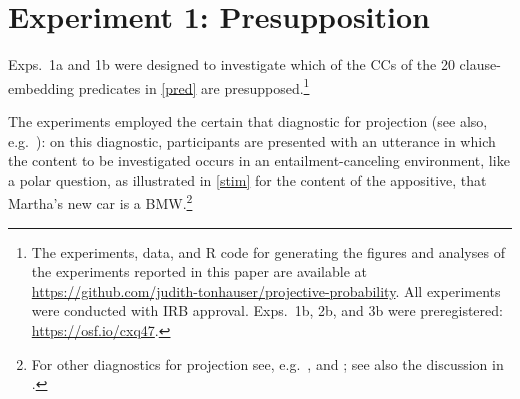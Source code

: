 \documentclass{language}
\newcommand{\6}{\mbox{$[\hspace*{-.6mm}[$}}
\newcommand{\9}{\mbox{$]\hspace*{-.6mm}]$}}
\begin{document}


%
%
%
%


\section{Experiment 1: Presupposition}\label{s2}

Exps.~1a and 1b were designed to investigate which of the CCs of the 20 clause-embedding predicates in \ref{pred} are presupposed.\footnote{\label{f-github}The experiments, data, and R code for generating the figures and analyses of the experiments reported in this paper are available at \url{https://github.com/judith-tonhauser/projective-probability}. All experiments were conducted with IRB approval. Exps.~1b, 2b, and 3b were preregistered: \url{https://osf.io/cxq47}.}

The experiments employed the {\sc certain that} diagnostic for projection (see also, e.g.\ \citealt{tonhauser-salt26,djaerv-bacovcin-salt27,stevens-etal2017,lorson2018,tbd-variability,mahler-nels,mahler2020,demarneffe-etal-sub23}): on this diagnostic, participants are presented with an utterance in which the content to be investigated occurs in an entailment-canceling environment, like a polar question, as illustrated in \ref{stim} for the content of the appositive, that Martha's new car is a BMW.\footnote{For other diagnostics for projection see, e.g.\ \citealt{smith-hall11,xue-onea11}, and \citealt{brst-lang11}; see also the discussion in \citealt{tbd-variability}.} 
\end{document}
